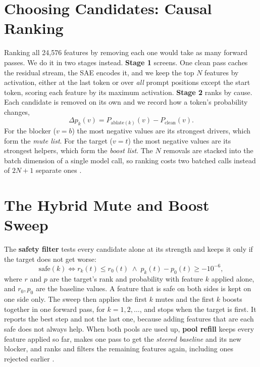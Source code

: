 \section{Choosing Candidates: Causal Ranking}\label{sec:selection}

Ranking all 24,576 features by removing each one would take as many forward passes. We do it in two stages instead. \textbf{Stage 1} screens. One clean pass caches the residual stream, the SAE encodes it, and we keep the top $N$ features by activation, either at the last token or over \emph{all} prompt positions except the start token, scoring each feature by its maximum activation. \textbf{Stage 2} ranks by cause. Each candidate is removed on its own and we record how a token's probability changes,
\begin{equation}\label{eq:causal}
\Delta p_k(v)=P_{\mathrm{ablate}(k)}(v)-P_{\mathrm{clean}}(v).
\end{equation}
For the blocker ($v=b$) the most negative values are its strongest drivers, which form the \emph{mute list}. For the target ($v=t$) the most negative values are its strongest helpers, which form the \emph{boost list}. The $N$ removals are stacked into the batch dimension of a single model call, so ranking costs two batched calls instead of $2N+1$ separate ones \cite{p5}.

\section{The Hybrid Mute and Boost Sweep}\label{sec:sweep}

The \textbf{safety filter} tests every candidate alone at its strength and keeps it only if the target does not get worse:
\begin{equation}\label{eq:safe}
\mathrm{safe}(k)\iff r_{k}(t)\le r_{0}(t)\;\wedge\;p_{k}(t)-p_{0}(t)\ge-10^{-6},
\end{equation}
where $r$ and $p$ are the target's rank and probability with feature $k$ applied alone, and $r_0,p_0$ are the baseline values. A feature that is safe on both sides is kept on one side only. The sweep then applies the first $k$ mutes and the first $k$ boosts together in one forward pass, for $k=1,2,\dots$, and stops when the target is first. It reports the best step and not the last one, because adding features that are each safe does not always help. When both pools are used up, \textbf{pool refill} keeps every feature applied so far, makes one pass to get the \emph{steered baseline} and its new blocker, and ranks and filters the remaining features again, including ones rejected earlier \cite{p3,p6}.

